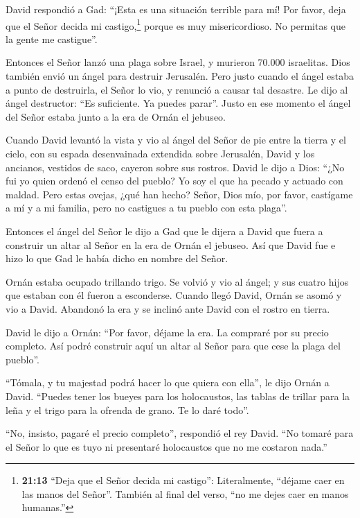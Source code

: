  David respondió a Gad: ``¡Esta es una situación terrible
para mí! Por favor, deja que el Señor decida mi castigo,\footnote{\textbf{21:13}
  ``Deja que el Señor decida mi castigo'': Literalmente, ``déjame caer
  en las manos del Señor''. También al final del verso, ``no me dejes
  caer en manos humanas.''} porque es muy misericordioso. No permitas
que la gente me castigue''.

 Entonces el Señor lanzó una plaga sobre Israel, y murieron
70.000 israelitas.  Dios también envió un ángel para
destruir Jerusalén. Pero justo cuando el ángel estaba a punto de
destruirla, el Señor lo vio, y renunció a causar tal desastre. Le dijo
al ángel destructor: ``Es suficiente. Ya puedes parar''. Justo en ese
momento el ángel del Señor estaba junto a la era de Ornán el jebuseo.

 Cuando David levantó la vista y vio al ángel del Señor de
pie entre la tierra y el cielo, con su espada desenvainada extendida
sobre Jerusalén, David y los ancianos, vestidos de saco, cayeron sobre
sus rostros.  David le dijo a Dios: ``¿No fui yo quien
ordenó el censo del pueblo? Yo soy el que ha pecado y actuado con
maldad. Pero estas ovejas, ¿qué han hecho? Señor, Dios mío, por favor,
castígame a mí y a mi familia, pero no castigues a tu pueblo con esta
plaga''.

 Entonces el ángel del Señor le dijo a Gad que le dijera a
David que fuera a construir un altar al Señor en la era de Ornán el
jebuseo.  Así que David fue e hizo lo que Gad le había
dicho en nombre del Señor.

 Ornán estaba ocupado trillando trigo. Se volvió y vio al
ángel; y sus cuatro hijos que estaban con él fueron a esconderse.
 Cuando llegó David, Ornán se asomó y vio a David. Abandonó
la era y se inclinó ante David con el rostro en tierra.

 David le dijo a Ornán: ``Por favor, déjame la era. La
compraré por su precio completo. Así podré construir aquí un altar al
Señor para que cese la plaga del pueblo''.

 ``Tómala, y tu majestad podrá hacer lo que quiera con
ella'', le dijo Ornán a David. ``Puedes tener los bueyes para los
holocaustos, las tablas de trillar para la leña y el trigo para la
ofrenda de grano. Te lo daré todo''.

 ``No, insisto, pagaré el precio completo'', respondió el
rey David. ``No tomaré para el Señor lo que es tuyo ni presentaré
holocaustos que no me costaron nada.''

